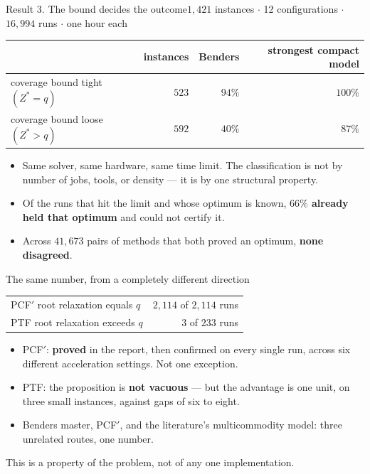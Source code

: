 \documentclass[11pt,aspectratio=169]{beamer}
\newcommand{\Zst}{Z^{*}}
\newcommand{\new}[1]{{\color{cAccent}#1}}
\newcommand{\keyline}[1]{\vspace{0.4em}{\color{cRule}\rule{\textwidth}{0.4pt}}\vspace{0.3em}\par#1}
\begin{document}
\begin{frame}{\new{Result 3.} The bound decides the outcome}{$1{,}421$ instances $\cdot$ 12 configurations $\cdot$ $16{,}994$ runs $\cdot$ one hour each}
\vspace{0.6em}
\centering
\begin{tabular}{@{}lrrr@{}}
\toprule
 & instances & Benders & strongest compact model\\
\midrule
coverage bound tight $(\Zst=q)$  & $523$ & \new{$94\%$} & $100\%$\\
coverage bound loose $(\Zst>q)$  & $592$ & \new{$40\%$} & $87\%$\\
\bottomrule
\end{tabular}
\vspace{1.0em}
\keyline{}
\begin{itemize}\itemsep3pt\small
  \item Same solver, same hardware, same time limit. The classification is not by number
  of jobs, tools, or density --- it is by one structural property.
  \item Of the runs that hit the limit and whose optimum is known, \textbf{$66\%$ already
  held that optimum} and could not certify it.
  \item Across $41{,}673$ pairs of methods that both proved an optimum, \textbf{none
  disagreed}.
\end{itemize}
\end{frame}

\begin{frame}{The same number, from a completely different direction}
\vspace{0.7em}
\begin{center}
\begin{tabular}{@{}lr@{}}
\toprule
PCF$'$ root relaxation equals $q$ & \new{$2{,}114$ of $2{,}114$ runs}\\
PTF root relaxation exceeds $q$   & $3$ of $233$ runs\\
\bottomrule
\end{tabular}
\end{center}
\vspace{1.0em}
\keyline{}
\begin{itemize}\itemsep5pt
  \item PCF$'$: \textbf{proved} in the report, then confirmed on every single run, across
  six different acceleration settings. Not one exception.
  \item PTF: the proposition is \textbf{not vacuous} --- but the advantage is one unit,
  on three small instances, against gaps of six to eight.
  \item Benders master, PCF$'$, and the literature's multicommodity model: three
  unrelated routes, one number.
\end{itemize}
\vspace{0.5em}
\centering\small
This is a property of the problem, not of any one implementation.
\end{frame}
\end{document}
